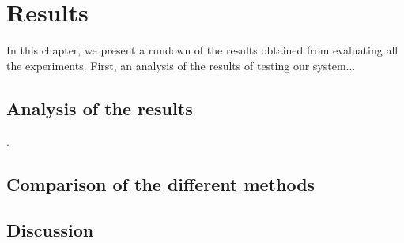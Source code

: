 \documentclass[../main.tex]{subfiles}
\begin{document}
\chapter{Results} \label{chap:results}

\vspace*{-0.35cm}
 In this chapter, we present a rundown of the results obtained from evaluating all the experiments. First, an analysis of the results of testing our system... 
 

    \section{Analysis of the results} \label{results:analysis}
. 
    
    \section{Comparison of the different methods}

    
    \section{Discussion}
    
    

\end{document}
